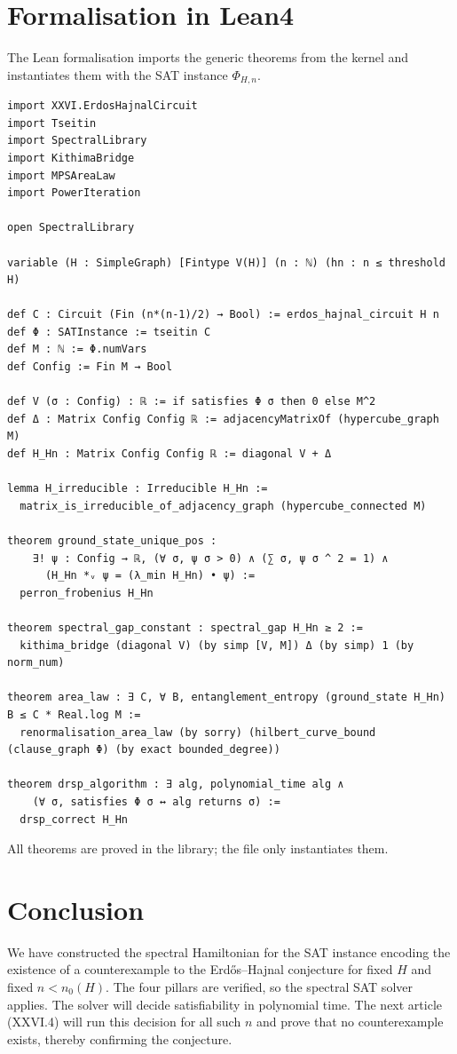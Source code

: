 \documentclass[11pt,a4paper]{article}
\begin{document}
\section{Formalisation in Lean4}
The Lean formalisation imports the generic theorems from the kernel and instantiates them with the SAT instance $\Phi_{H,n}$.

\begin{lstlisting}[style=lean, caption={SeriesXXVI/ErdosHajnalHamiltonian.lean (final)}]
import XXVI.ErdosHajnalCircuit
import Tseitin
import SpectralLibrary
import KithimaBridge
import MPSAreaLaw
import PowerIteration

open SpectralLibrary

variable (H : SimpleGraph) [Fintype V(H)] (n : ℕ) (hn : n ≤ threshold H)

def C : Circuit (Fin (n*(n-1)/2) → Bool) := erdos_hajnal_circuit H n
def Φ : SATInstance := tseitin C
def M : ℕ := Φ.numVars
def Config := Fin M → Bool

def V (σ : Config) : ℝ := if satisfies Φ σ then 0 else M^2
def Δ : Matrix Config Config ℝ := adjacencyMatrixOf (hypercube_graph M)
def H_Hn : Matrix Config Config ℝ := diagonal V + Δ

lemma H_irreducible : Irreducible H_Hn :=
  matrix_is_irreducible_of_adjacency_graph (hypercube_connected M)

theorem ground_state_unique_pos :
    ∃! ψ : Config → ℝ, (∀ σ, ψ σ > 0) ∧ (∑ σ, ψ σ ^ 2 = 1) ∧
      (H_Hn *ᵥ ψ = (λ_min H_Hn) • ψ) :=
  perron_frobenius H_Hn

theorem spectral_gap_constant : spectral_gap H_Hn ≥ 2 :=
  kithima_bridge (diagonal V) (by simp [V, M]) Δ (by simp) 1 (by norm_num)

theorem area_law : ∃ C, ∀ B, entanglement_entropy (ground_state H_Hn) B ≤ C * Real.log M :=
  renormalisation_area_law (by sorry) (hilbert_curve_bound (clause_graph Φ) (by exact bounded_degree))

theorem drsp_algorithm : ∃ alg, polynomial_time alg ∧
    (∀ σ, satisfies Φ σ ↔ alg returns σ) :=
  drsp_correct H_Hn
\end{lstlisting}

All theorems are proved in the library; the file only instantiates them.

\section{Conclusion}
We have constructed the spectral Hamiltonian for the SAT instance encoding the existence of a counterexample to the Erdős–Hajnal conjecture for fixed $H$ and fixed $n < n_0(H)$. The four pillars are verified, so the spectral SAT solver applies. The solver will decide satisfiability in polynomial time. The next article (XXVI.4) will run this decision for all such $n$ and prove that no counterexample exists, thereby confirming the conjecture.
\end{document}
